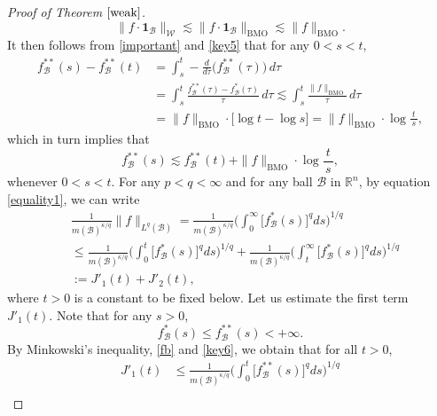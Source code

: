 \documentclass{birkjour}
\theoremstyle{definition}
\theoremstyle{remark}
\numberwithin{equation}{section}
\begin{document}
\begin{proof}[Proof of Theorem $\ref{weak}$]
\begin{equation}\label{key5}
\|f\cdot\mathbf{1}_{\mathcal{B}}\|_{\mathcal{W}}\lesssim\|f\cdot\mathbf{1}_{\mathcal{B}}\|_{\mathrm{BMO}}
\lesssim\|f\|_{\mathrm{BMO}}.
\end{equation}
It then follows from \eqref{important} and \eqref{key5} that for any $0<s<t$,
\begin{equation*}
\begin{split}
f^{**}_{\mathcal{B}}(s)-f^{**}_{\mathcal{B}}(t)&=\int_{s}^t-\frac{d}{d\tau}\big(f^{**}_{\mathcal{B}}(\tau)\big)\,d\tau\\
&=\int_{s}^t\frac{f^{**}_{\mathcal{B}}(\tau)-f^{*}_{\mathcal{B}}(\tau)}{\tau}\,d\tau
\lesssim\int_{s}^t\frac{\|f\|_{\mathrm{BMO}}}{\tau}\,d\tau\\
&=\|f\|_{\mathrm{BMO}}\cdot\big[\log t-\log s\big]=\|f\|_{\mathrm{BMO}}\cdot\log\frac{t}{\,s\,},
\end{split}
\end{equation*}
which in turn implies that
\begin{equation}\label{key6}
f^{**}_{\mathcal{B}}(s)\lesssim f^{**}_{\mathcal{B}}(t)+\|f\|_{\mathrm{BMO}}\cdot\log\frac{t}{\,s\,},
\end{equation}
whenever $0<s<t$. For any $p<q<\infty$ and for any ball $\mathcal{B}$ in $\mathbb R^n$, by equation \eqref{equality1}, we can write
\begin{equation*}
\begin{split}
&\frac{1}{m(\mathcal{B})^{\kappa/q}}\|f\|_{L^{q}(\mathcal{B})}
=\frac{1}{m(\mathcal{B})^{\kappa/q}}\bigg(\int_0^{\infty}\big[f^{*}_{\mathcal{B}}(s)\big]^qds\bigg)^{1/q}\\
&\leq\frac{1}{m(\mathcal{B})^{\kappa/q}}\bigg(\int_0^{t}\big[f^{*}_{\mathcal{B}}(s)\big]^qds\bigg)^{1/q}
+\frac{1}{m(\mathcal{B})^{\kappa/q}}\bigg(\int_{t}^{\infty}\big[f^{*}_{\mathcal{B}}(s)\big]^qds\bigg)^{1/q}\\
&:=J'_1(t)+J'_2(t),
\end{split}
\end{equation*}
where $t>0$ is a constant to be fixed below. Let us estimate the first term $J'_1(t)$. Note that for any $s>0$,
\begin{equation}\label{fb}
f^{*}_{\mathcal{B}}(s)\leq f^{**}_{\mathcal{B}}(s)<+\infty.
\end{equation}
By Minkowski's inequality, \eqref{fb} and \eqref{key6}, we obtain that for all $t>0$,
\begin{equation*}
\begin{split}
J'_1(t)&\leq\frac{1}{m(\mathcal{B})^{\kappa/q}}\bigg(\int_0^{t}\big[f^{**}_{\mathcal{B}}(s)\big]^qds\bigg)^{1/q}\\

\end{split}
\end{equation*}
\end{proof}
\end{document}
